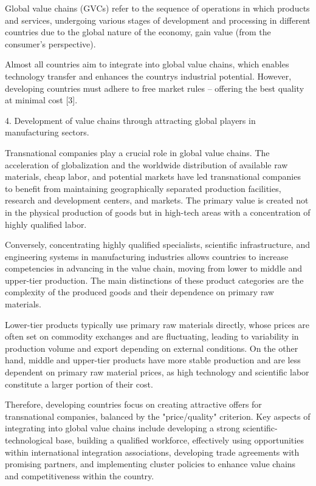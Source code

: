 \begin{multicols}{2}
Global value chains (GVCs) refer to the sequence of operations in which
products and services, undergoing various stages of development and
processing in different countries due to the global nature of the
economy, gain value (from the consumer's perspective).

Almost all countries aim to integrate into global value chains, which
enables technology transfer and enhances the country\textquotesingle s
industrial potential. However, developing countries must adhere to free
market rules -- offering the best quality at minimal cost {[}3{]}.

4. Development of value chains through attracting global players in
manufacturing sectors.

Transnational companies play a crucial role in global value chains. The
acceleration of globalization and the worldwide distribution of
available raw materials, cheap labor, and potential markets have led
transnational companies to benefit from maintaining geographically
separated production facilities, research and development centers, and
markets. The primary value is created not in the physical production of
goods but in high-tech areas with a concentration of highly qualified
labor.

Conversely, concentrating highly qualified specialists, scientific
infrastructure, and engineering systems in manufacturing industries
allows countries to increase competencies in advancing in the value
chain, moving from lower to middle and upper-tier production. The main
distinctions of these product categories are the complexity of the
produced goods and their dependence on primary raw materials.

Lower-tier products typically use primary raw materials directly, whose
prices are often set on commodity exchanges and are fluctuating, leading
to variability in production volume and export depending on external
conditions. On the other hand, middle and upper-tier products have more
stable production and are less dependent on primary raw material prices,
as high technology and scientific labor constitute a larger portion of
their cost.

Therefore, developing countries focus on creating attractive offers for
transnational companies, balanced by the "price/quality" criterion. Key
aspects of integrating into global value chains include developing a
strong scientific-technological base, building a qualified workforce,
effectively using opportunities within international integration
associations, developing trade agreements with promising partners, and
implementing cluster policies to enhance value chains and
competitiveness within the country.


\end{multicols}
